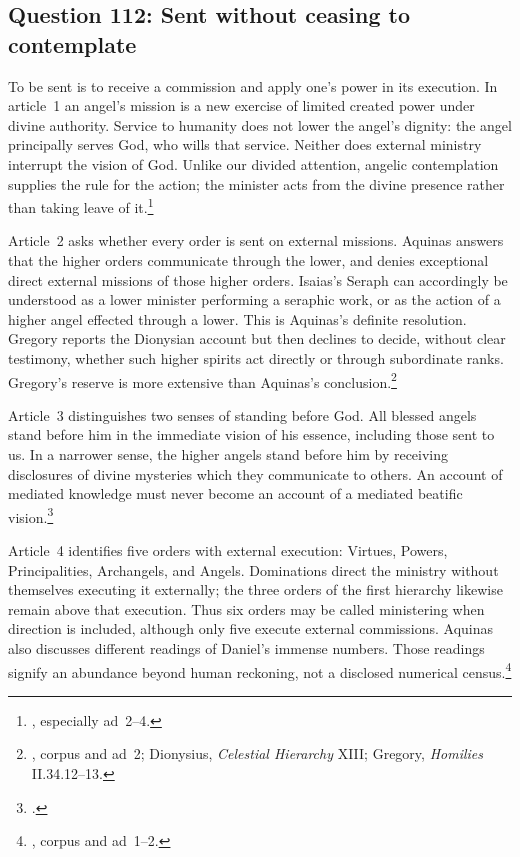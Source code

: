 
\subsection{Question 112: Sent without ceasing to contemplate}\label{q112}
To be sent is to receive a commission and apply one's power in its execution. In article~1 an angel's mission is a new exercise of limited created power under divine authority. Service to humanity does not lower the angel's dignity: the angel principally serves God, who wills that service. Neither does external ministry interrupt the vision of God. Unlike our divided attention, angelic contemplation supplies the rule for the action; the minister acts from the divine presence rather than taking leave of it.\footnote{, especially ad~2--4.}

Article~2 asks whether every order is sent on external missions. Aquinas answers that the higher orders communicate through the lower, and denies exceptional direct external missions of those higher orders. Isaias's Seraph can accordingly be understood as a lower minister performing a seraphic work, or as the action of a higher angel effected through a lower. This is Aquinas's definite resolution. Gregory reports the Dionysian account but then declines to decide, without clear testimony, whether such higher spirits act directly or through subordinate ranks. Gregory's reserve is more extensive than Aquinas's conclusion.\footnote{, corpus and ad~2; Dionysius, \emph{Celestial Hierarchy} XIII; Gregory, \emph{Homilies} II.34.12--13.}

Article~3 distinguishes two senses of standing before God. All blessed angels stand before him in the immediate vision of his essence, including those sent to us. In a narrower sense, the higher angels stand before him by receiving disclosures of divine mysteries which they communicate to others. An account of mediated knowledge must never become an account of a mediated beatific vision.\footnote{.}

Article~4 identifies five orders with external execution: Virtues, Powers, Principalities, Archangels, and Angels. Dominations direct the ministry without themselves executing it externally; the three orders of the first hierarchy likewise remain above that execution. Thus six orders may be called ministering when direction is included, although only five execute external commissions. Aquinas also discusses different readings of Daniel's immense numbers. Those readings signify an abundance beyond human reckoning, not a disclosed numerical census.\footnote{, corpus and ad~1--2.}

